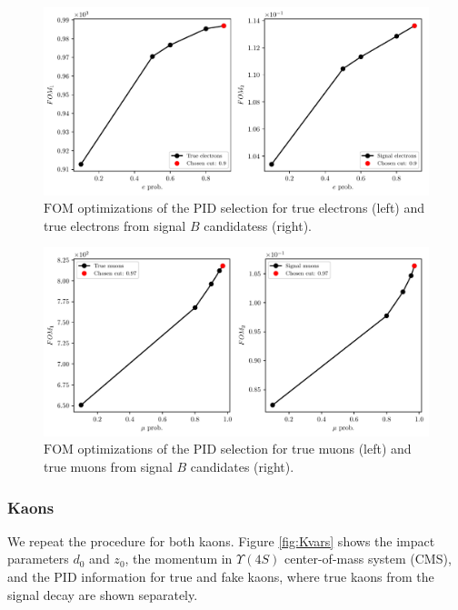 \begin{figure}[H]
	\centering
	\captionsetup{width=.8\linewidth}
	\includegraphics[width=\linewidth]{fig/FSP_e_fom}
	\caption{$\mathrm{FOM}$ optimizations of the PID selection for true electrons (left) and true electrons from signal $B$ candidatess (right).}
	\label{fig:efom}
\end{figure}

\begin{figure}[H]
	\centering
	\captionsetup{width=.8\linewidth}
	\includegraphics[width=\linewidth]{fig/FSP_mu_fom}
	\caption{$\mathrm{FOM}$ optimizations of the PID selection for true muons (left) and true muons from signal $B$ candidates (right).}
	\label{fig:mufom}
\end{figure}


\subsubsection{Kaons}

We repeat the procedure for both kaons. Figure \ref{fig:Kvars} shows the impact parameters $d_0$ and $z_0$, the momentum in  $\Upsilon(4S)$ center-of-mass system (CMS), and the PID information for true and fake kaons, where true kaons from the signal decay are shown separately.

